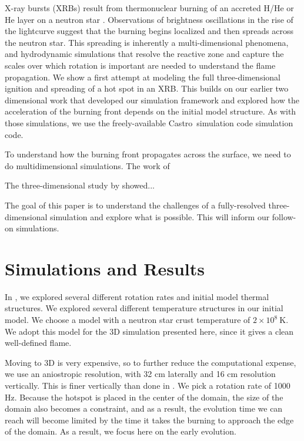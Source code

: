 \documentclass[twocolumn,times,tighten]{aastex631}
\newcommand{\castro}{{\sf Castro}}
\begin{document}
X-ray bursts (XRBs) result from thermonuclear burning of an accreted
H/He or He layer on a neutron star \citep{galloway:2017}.
Observations of brightness oscillations in the rise of the lightcurve
suggest that the burning begins localized and then spreads across the
neutron star.  This spreading is inherently a multi-dimensional
phenomena, and hydrodynamic simulations that resolve the reactive zone
and capture the scales over which rotation is important are needed to
understand the flame propagation.  We show a first attempt at modeling
the full three-dimensional ignition and spreading of a hot spot in an
XRB.  This builds on our earlier two dimensional work
\citep{eiden:2020,harpole:2021} that developed our simulation
framework and explored how the acceleration of the burning front
depends on the initial model structure.  As with those simulations, we
use the freely-available \castro\ simulation code
\citep{castro,castro_joss} simulation code.


To understand how the burning front propagates across the surface, we
need to do multidimensional simulations.  The work of
\citet{cavecchi:2013,art-2015-cavecchi-etal,art-2016-cavecchi-etal}

The three-dimensional study by \citet{Cavecchi2019} showed...

The goal of this paper is to understand the challenges of a fully-resolved
three-dimensional simulation and explore what is possible.  This will inform
our follow-on simulations.

\section{Simulations and Results}\label{Sec:results}

In \citet{harpole:2021}, we explored several different rotation rates
and initial model thermal structures.  We explored several different
temperature structures in our initial model.  We choose a model with a
neutron star crust temperature of $2\times 10^8~\mathrm{K}$.  We adopt
this model for the 3D simulation presented here, since it gives a clean
well-defined flame.

Moving to 3D is very expensive, so to further reduce the computational
expense, we use an aniostropic resolution, with 32 cm laterally and 16 cm resolution
vertically.  This is finer vertically than done in 
\citet{harpole:2021}.  We pick a rotation rate of 1000 Hz.
Because the hotspot is placed in the center of the domain, the size of
the domain also becomes a constraint, and as a result, the evolution
time we can reach will become limited by the time it takes the burning
to approach the edge of the domain.  As a result, we focus here on the
early evolution.
\end{document}
